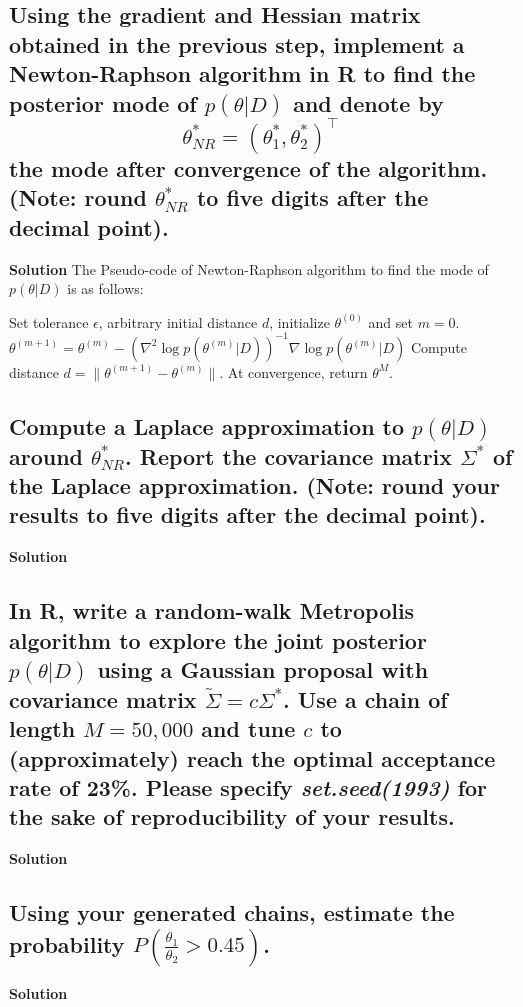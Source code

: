 \documentclass[12pt]{article}
\begin{document}
\subsection{Using the gradient and Hessian matrix obtained in the previous step, implement a Newton-Raphson algorithm in R to find the posterior mode of \( p(\theta|D) \) and denote by
\[
\theta^*_{NR} = (\theta^*_1, \theta^*_2)^\top
\]
the mode after convergence of the algorithm. (Note: round \( \theta^*_{NR} \) to five digits after the decimal point).}
\textbf{Solution}
The Pseudo-code of Newton-Raphson algorithm to find the mode of \( p(\theta|D) \) is as follows:

\begin{algorithm}
\begin{algorithmic}[1]
\State Set tolerance \( \epsilon \), arbitrary initial distance \( d \), initialize \( \theta^{(0)} \) and set \( m = 0 \).
    \State \( \theta^{(m+1)} = \theta^{(m)} - \left( \nabla^2 \log p(\theta^{(m)}|D) \right)^{-1} \nabla \log p(\theta^{(m)}|D) \)
    \State Compute distance \( d = \|\theta^{(m+1)} - \theta^{(m)}\| \).
\EndWhile
\State At convergence, return \( \theta^M \).
\end{algorithmic}
\end{algorithm}

\subsection{Compute a Laplace approximation to \( p(\theta|D) \) around \( \theta^*_{NR} \). Report the covariance matrix \( \Sigma^* \) of the Laplace approximation. (Note: round your results to five digits after the decimal point).}
\textbf{Solution}

\subsection{In R, write a random-walk Metropolis algorithm to explore the joint posterior \( p(\theta|D) \) using a Gaussian proposal with covariance matrix \( \tilde{\Sigma} = c\Sigma^* \). Use a chain of length \( M = 50,000 \) and tune \( c \) to (approximately) reach the optimal acceptance rate of 23\%. Please specify \textit{set.seed(1993)} for the sake of reproducibility of your results.}
\textbf{Solution}

\subsection{Using your generated chains, estimate the probability \( P\left(\frac{\theta_1}{\theta_2} > 0.45\right) \).}
\textbf{Solution}

\printbibliography
\end{document}
